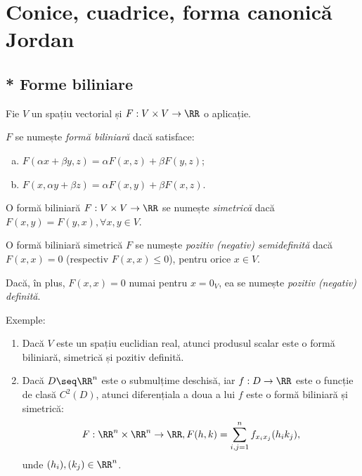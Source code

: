\chapter{Conice, cuadrice, forma canonică Jordan}

\section{* Forme biliniare}
\label{sec:biliniare}

\begin{definition}\label{def:forma-bil}
  Fie $V$ un spațiu vectorial și $F : V \times V \to \RR$ o aplicație.

  $F$ se numește \emph{formă biliniară} dacă satisface:
  \begin{enumerate}[(a)]
  \item $F(\alpha x + \beta y, z) = \alpha F(x, z) + \beta F(y, z)$;
  \item $F(x, \alpha y + \beta z) = \alpha F(x, y) + \beta F(x, z)$.
  \end{enumerate}
\end{definition}

\begin{definition}\label{def:bil-sim}
  O formă biliniară $F : V \times V \to \RR$ se numește \emph{simetrică} dacă
  $F(x, y) = F(y, x), \forall x, y \in V$.
\end{definition}


\begin{definition}\label{def:bil-neg-def}
  O formă biliniară simetrică $F$ se numește \emph{pozitiv (negativ) semidefinită}
  dacă $F(x, x) = 0$ (respectiv $F(x, x) \leq 0$), pentru orice $x \in V$.

  Dacă, în plus, $F(x, x) = 0$ numai pentru $x = 0_V$, ea se numește \emph{pozitiv %
  (negativ) definită}.
\end{definition}

Exemple:
\begin{enumerate}[(1)]
\item Dacă $V$ este un spațiu euclidian real, atunci produsul scalar este o formă
  biliniară, simetrică și pozitiv definită.
\item Dacă $D \seq \RR^n$ este o submulțime deschisă, iar $f : D \to \RR$ este o
  funcție de clasă $C^2(D)$, atunci diferențiala a doua a lui $f$ este o formă
  biliniară și simetrică:
  \[
    F : \RR^n \times \RR^n \to \RR, F(h, k) = \sum_{i, j = 1}^n f_{x_i x_j}(h_i k_j),
  \]
  unde $(h_i), (k_j) \in \RR^n$.
\end{enumerate}


